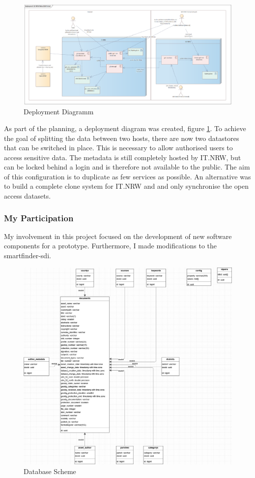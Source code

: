 \documentclass[11pt, titlepage, a4paper]{article}
\begin{document}
\begin{figure}[t]
	\caption{Deployment Diagramm}
	\label{fig:deployment}
	\includegraphics[width=16cm]{deployment.png}
	\centering
\end{figure}

As part of the planning, a deployment diagram was created, figure \ref{fig:deployment}. To achieve the goal of splitting the data between two hosts, there are now two datastores that can be switched in place. This is necessary to allow authorised users to access sensitive data. The metadata is still completely hosted by IT.NRW, but can be locked behind a login and is therefore not available to the public. The aim of this configuration is to duplicate as few services as possible.
An alternative was to build a complete clone system for IT.NRW and  and only synchronise the open access datasets.

\subsubsection{My Participation}
My involvement in this project focused on the development of new software components for a prototype. Furthermore, I made modifications to the smartfinder-sdi.

\begin{figure}[t]
	\caption{Database Scheme}
	\label{fig:db}
	\includegraphics[width=16cm]{db3.png}
	\centering
\end{figure}
\end{document}
